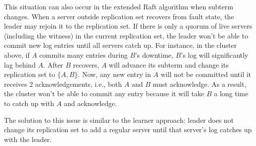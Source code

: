 This situation can also occur in the extended Raft algorithm when subterm changes. When a server outside replication set recovers from fault state, the leader may rejoin it to the replication set. If there is only a quorum of live servers (including the witness) in the current replication set, the leader won't be able to commit new log entries until all servers catch up. For instance, in the cluster above, if $A$ commits many entries during $B$'s downtime, $B$'s log will significantly lag behind $A$. After $B$ recovers, $A$ will advance its subterm and change its replication set to $\{A, B\}$. Now, any new entry in $A$ will not be committed until it receives $2$ acknowledgements, i.e., both $A$ and $B$ must acknowledge. As a result, the cluster won't be able to commit any entry because it will take $B$ a long time to catch up with $A$ and acknowledge.

The solution to this issue is similar to the learner approach: leader does not change its replication set to add a regular server until that server's log catches up with the leader.